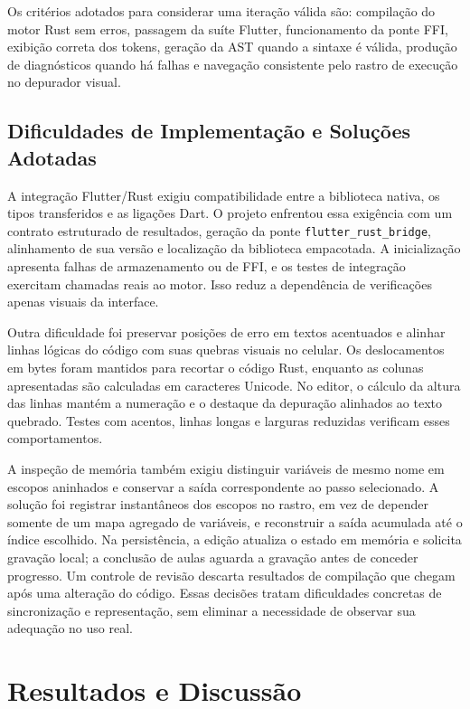 \documentclass[
    12pt
    ,oneside
    ,a4paper
    ,chapter=TITLE
    ,section=TITLE
    ,sumario=abnt-6027-2012]{abntex2}
\begin{document}
Os critérios adotados para considerar uma iteração válida são: compilação do motor Rust
sem erros, passagem da suíte Flutter, funcionamento da ponte FFI, exibição correta dos tokens,
geração da AST quando a sintaxe é válida, produção de diagnósticos quando há falhas e
navegação consistente pelo rastro de execução no depurador visual.



\section{Dificuldades de Implementação e Soluções Adotadas}
\label{sec:dificuldades_implementacao}

A integração Flutter/Rust exigiu compatibilidade entre a biblioteca nativa, os tipos
transferidos e as ligações Dart. O projeto enfrentou essa exigência com um
contrato estruturado de resultados, geração da ponte \texttt{flutter\_rust\_bridge},
alinhamento de sua versão e localização da biblioteca empacotada. A inicialização
apresenta falhas de armazenamento ou de FFI, e os testes de integração exercitam chamadas
reais ao motor. Isso reduz a dependência de verificações apenas visuais da interface.

Outra dificuldade foi preservar posições de erro em textos acentuados e alinhar linhas
lógicas do código com suas quebras visuais no celular. Os deslocamentos em bytes foram
mantidos para recortar o código Rust, enquanto as colunas apresentadas são calculadas em
caracteres Unicode. No editor, o cálculo da altura das linhas mantém a numeração e o
destaque da depuração alinhados ao texto quebrado. Testes com acentos, linhas longas e
larguras reduzidas verificam esses comportamentos.

A inspeção de memória também exigiu distinguir variáveis de mesmo nome em escopos
aninhados e conservar a saída correspondente ao passo selecionado. A solução foi
registrar instantâneos dos escopos no rastro, em vez de depender somente de um mapa
agregado de variáveis, e reconstruir a saída acumulada até o índice escolhido.
Na persistência, a edição atualiza o estado em memória e solicita gravação local; a
conclusão de aulas aguarda a gravação antes de conceder progresso. Um controle de
revisão descarta resultados de compilação que chegam após uma alteração do código.
Essas decisões tratam dificuldades concretas de sincronização e representação,
sem eliminar a necessidade de observar sua adequação no uso real.

\chapter{Resultados e Discussão}
\label{cap:resultados}
\end{document}
